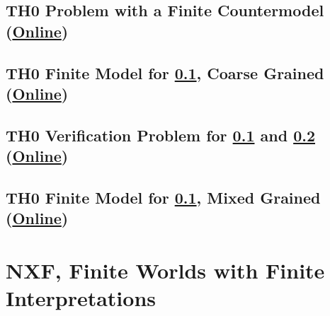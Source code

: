 \documentclass{easychair}
\begin{document}
\subsection{TH0 Problem with a Finite Countermodel
(\href{https://raw.githubusercontent.com/GeoffsPapers/InterpretationFormat/master/Examples/THF_Finite.p}{Online})}
\label{THF_Finite.p}
\begin{small}

\end{small}

\newpage
\subsection{TH0 Finite Model for \ref{THF_Finite.p}, Coarse Grained
(\href{https://raw.githubusercontent.com/GeoffsPapers/InterpretationFormat/master/Examples/THF_Finite.s}{Online})}
\label{THF_Finite.s}
\begin{small}

\end{small}

\newpage
\subsection{TH0 Verification Problem for \ref{THF_Finite.p} and \ref{THF_Finite.s}
(\href{https://raw.githubusercontent.com/GeoffsPapers/InterpretationFormat/master/Examples/THF_Finite.s.p}{Online})}
\label{THF_Finite.s.p}
\begin{small}

\end{small}

\newpage
\subsection{TH0 Finite Model for \ref{THF_Finite.p}, Mixed Grained
(\href{https://raw.githubusercontent.com/GeoffsPapers/InterpretationFormat/master/Examples/THF_Finite_Medium.s}{Online})}
\label{THF_Finite_Medium.s}
\begin{small}

\end{small}

\newpage
\section{NXF, Finite Worlds with Finite Interpretations}
\label{NXF}
\end{document}
